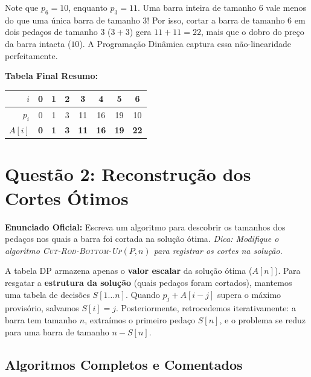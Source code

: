 \documentclass[11pt,a4paper]{article}
\begin{document}
\begin{alerta}
Note que $p_6 = 10$, enquanto $p_3 = 11$. Uma barra inteira de tamanho 6 vale menos do que uma única barra de tamanho 3! Por isso, cortar a barra de tamanho 6 em dois pedaços de tamanho 3 ($3 + 3$) gera $11 + 11 = 22$, mais que o dobro do preço da barra intacta ($10$). A Programação Dinâmica captura essa não-linearidade perfeitamente.
\end{alerta}

\textbf{Tabela Final Resumo:}
\begin{center}
\begin{tabular}{r|ccccccc}
\toprule
$i$ & 0 & 1 & 2 & 3 & 4 & 5 & 6 \\
\midrule
$p_i$ & 0 & 1 & 3 & 11 & 16 & 19 & 10 \\
$A[i]$ & \textbf{0} & \textbf{1} & \textbf{3} & \textbf{11} & \textbf{16} & \textbf{19} & \textbf{22} \\
\bottomrule
\end{tabular}
\end{center}

\vspace{0.4cm}

\section*{Questão 2: Reconstrução dos Cortes Ótimos}

\textbf{Enunciado Oficial:} Escreva um algoritmo para descobrir os tamanhos dos pedaços nos quais a barra foi cortada na solução ótima. \emph{Dica: Modifique o algoritmo \textsc{Cut-Rod-Bottom-Up}$(P, n)$ para registrar os cortes na solução.}

\begin{teoria}
A tabela DP armazena apenas o \textbf{valor escalar} da solução ótima ($A[n]$). Para resgatar a \textbf{estrutura da solução} (quais pedaços foram cortados), mantemos uma tabela de decisões $S[1 \dots n]$. 
Quando $p_j + A[i-j]$ supera o máximo provisório, salvamos $S[i] = j$. Posteriormente, retrocedemos iterativamente: a barra tem tamanho $n$, extraímos o primeiro pedaço $S[n]$, e o problema se reduz para uma barra de tamanho $n - S[n]$.
\end{teoria}

\subsection*{Algoritmos Completos e Comentados}
\end{document}
